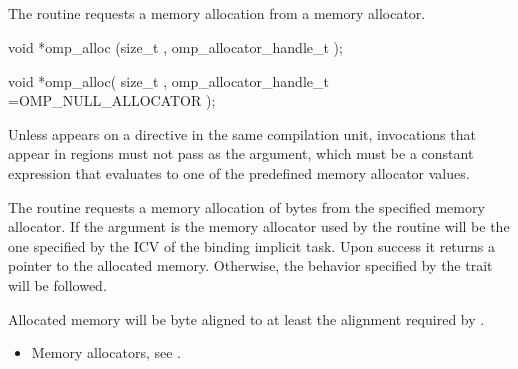 \vspace{3ex}  %
\begin{ccppspecific}
\vspace{-7ex}  %
\subsection{}
\label{subsec:omp_alloc}

\summary
The  routine requests a memory allocation from a memory allocator.

\format
\begin{cspecific}
\begin{ompcFunction}
void *omp_alloc (size_t , omp_allocator_handle_t );
\end{ompcFunction}
\end{cspecific}
\begin{cppspecific}

\begin{ompcFunction}
void *omp_alloc(
  size_t ,
  omp_allocator_handle_t =OMP_NULL_ALLOCATOR
);
\end{ompcFunction}
\end{cppspecific}

\constraints
Unless  appears on a  directive in the
same compilation unit,  invocations that appear in  
regions must not pass  as the  argument, 
which must be a constant expression that evaluates to one of the predefined memory 
allocator values.

\effect
The  routine requests a memory allocation of  
bytes from the specified memory allocator. If the  argument 
is  the memory allocator used by the routine will 
be the one specified by the  ICV of the binding 
implicit task. Upon success it returns a pointer to the allocated memory. 
Otherwise, the behavior specified by the  trait will be followed.

Allocated memory will be byte aligned to at least the alignment required by .

\crossreferences
\begin{itemize}
\item Memory allocators, see .
\end{itemize}




\end{ccppspecific}
